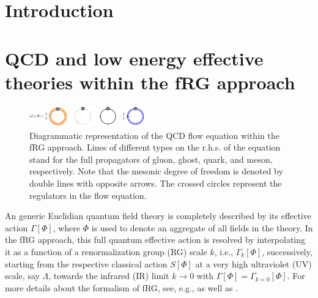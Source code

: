 \documentclass[%
reprint,
superscriptaddress,
showpacs,preprintnumbers,
 amsmath,amssymb,
 aps,
prd,
]{revtex4-1}
\begin{document}

\section{Introduction}
\label{sec:int}










\section{QCD and low energy effective theories within the fRG approach}
\label{sec:FRG}

%
\begin{figure}[t]
\includegraphics[width=0.45\textwidth]{QCD_equation}
\caption{Diagrammatic representation of the QCD flow equation within the fRG approach. Lines of different types on the r.h.s. of the equation stand for the full propagators of gluon, ghost, quark, and meson, respectively. Note that the mesonic degree of freedom is denoted by double lines with opposite arrows. The crossed circles represent the regulators in the flow equation.}\label{fig:QCD_equation}
\end{figure}
%

An generic Euclidian quantum field theory is completely described by its effective action $\Gamma[\Phi]$, where $\Phi$ is used to denote an aggregate of all fields in the theory. In the fRG approach, this full quantum effective action is resolved by  
interpolating it as a function of a renormalization group (RG) scale $k$, i.e.,  $\Gamma_k[\Phi]$, successively, starting from the respective classical action $S[\Phi]$ at a very high ultraviolet (UV) scale, say $\Lambda$, towards the infrared (IR) limit $k\rightarrow 0$ with $\Gamma[\Phi]=\Gamma_{k=0}[\Phi]$. For more details about the formalism of fRG, see, e.g., \cite{Wetterich:1992yh} as well as \cite{Ellwanger:1993mw,Morris:1993qb}. 
\end{document}
